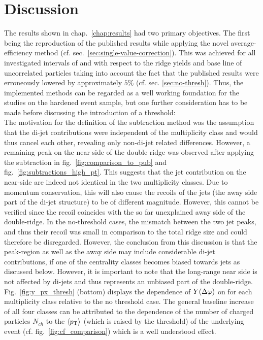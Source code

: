 
\chapter{Discussion}
\label{chap:discussion}
The results shown in chap.~\ref{chap:results} had two primary objectives. The first being the reproduction of the published results while applying the novel average-efficiency method (cf. sec.~\ref{sec:single-value-correction}). This was achieved for all investigated intervals of \ptassoc and \pttrig with respect to the ridge yields and base line of uncorrelated particles taking into account the fact that the published results were erroneously lowered by approximately $5\%$ (cf. sec. \ref{sec:no-thresh}). Thus, the implemented methods can be regarded as a well working foundation for the studies on the hardened event sample, but one further consideration has to be made before discussing the introduction of a threshold:\\
The motivation for the definition of the subtraction method was the assumption that the di-jet contributions were independent of the multiplicity class and would thus cancel each other, revealing only non-di-jet related differences. However, a remaining peak on the near side of the double ridge was observed after applying the subtraction in fig.~\ref{fig:comparison_to_pub} and fig.~\ref{fig:subtractions_high_pt}. This suggests that the jet contribution on the near-side are indeed not identical in the two multiplicity classes. Due to momentum conservation, this will also cause the recoils of the jets (the away side part of the di-jet structure) to be of different magnitude. However, this cannot be verified since the recoil coincides with the so far unexplained away side of the double-ridge. In the no-threshold cases, the mismatch between the two jet peaks, and thus their recoil was small in comparison to the total ridge size and could therefore be disregarded. However, the conclusion from this discussion is that the peak-region as well as the away side may include considerable di-jet contributions, if one of the centrality classes becomes biased towards jets as discussed below. However, it is important to note that the long-range near side is not affected by di-jets and thus represents an unbiased part of the double-ridge.\\

Fig.~\ref{fig:y_px_thresh} (bottom) displays the dependence of $Y(\Delta\varphi)$ on \ptthresh for each multiplicity class relative to the no threshold case. The general baseline increase of all four classes can be attributed to the dependence of the number of charged particles $N_{ch}$ to the  $\left< p_{\text{T}} \right>$ (which is raised by the threshold) of the underlying event (cf. fig.~\ref{fig:cf_comparison}) which is a well understood effect.\\

